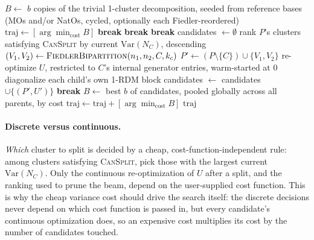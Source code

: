 \documentclass[10pt]{article}
\newcommand{\Var}{\mathrm{Var}}
\DeclarePairedDelimiter{\abs}{\lvert}{\rvert}
\begin{document}
\begin{algorithm}[h]
\caption{\textsc{RunDecompositionOptimizer}}
\label{alg:beam}
\begin{algorithmic}[1]
\small
\State $B \gets$ $b$ copies of the trivial 1-cluster decomposition, seeded from reference bases
    (MOs and/or NatOs, cycled, optionally each Fiedler-reordered)
\State $\mathrm{traj} \gets [\arg\min_{\text{cost}} B]$
   \textbf{break} \EndIf
   \textbf{break} \EndIf
   \textbf{break} \EndIf
  \State candidates $\gets \emptyset$
    \State rank $P$'s clusters satisfying \textsc{CanSplit} by current $\Var(N_C)$, descending
      \State $(V_1,V_2) \gets \textsc{FiedlerBipartition}(n_1,n_2,C,k_c)$ 
      \State $P' \gets (P\setminus\{C\})\cup\{V_1,V_2\}$ 
      \State re-optimize $U$, restricted to $C$'s internal generator entries, warm-started at $0$
       diagonalize each child's own 1-RDM block  \EndIf
      \State candidates $\gets$ candidates $\cup \{(P',U')\}$
    \EndFor
  \EndFor
   \textbf{break} \EndIf
  \State $B \gets$ best $b$ of candidates, pooled globally across all parents, by cost
  \State $\mathrm{traj} \gets \mathrm{traj} + [\arg\min_{\text{cost}} B]$
\EndWhile
\State \Return $\mathrm{traj}$
\end{algorithmic}
\end{algorithm}

\paragraph{Discrete versus continuous.} \emph{Which} cluster to split is decided by a cheap,
cost-function-independent rule: among clusters satisfying \textsc{CanSplit}, pick those with the
largest current $\Var(N_C)$. Only the continuous re-optimization of $U$ after a split, and the
ranking used to prune the beam, depend on the user-supplied cost function. This is why the cheap
variance cost should drive the search itself: the discrete decisions never depend on which cost
function is passed in, but every candidate's continuous optimization does, so an expensive cost
multiplies its cost by the number of candidates touched.
\end{document}
